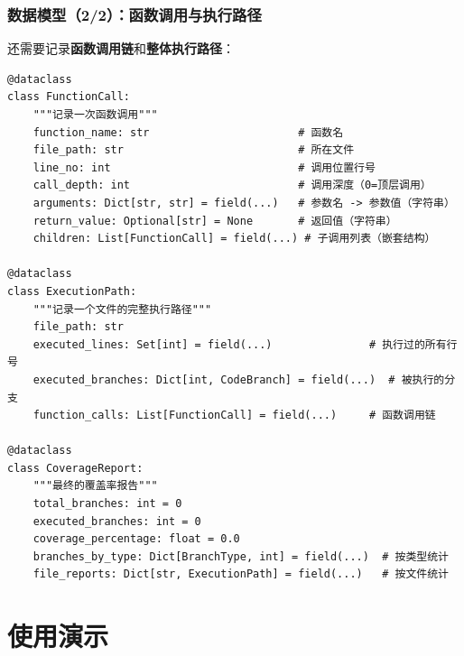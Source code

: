 \documentclass[presentation,aspectratio=169]{ctexbeamer}
\begin{document}
\begin{frame}[fragile]
\frametitle{数据模型（2/2）：函数调用与执行路径}
{\footnotesize 还需要记录\textbf{函数调用链}和\textbf{整体执行路径}：}

\vspace{0.05cm}
{\tiny
\begin{verbatim}
@dataclass
class FunctionCall:
    """记录一次函数调用"""
    function_name: str                       # 函数名
    file_path: str                           # 所在文件
    line_no: int                             # 调用位置行号
    call_depth: int                          # 调用深度（0=顶层调用）
    arguments: Dict[str, str] = field(...)   # 参数名 -> 参数值（字符串）
    return_value: Optional[str] = None       # 返回值（字符串）
    children: List[FunctionCall] = field(...) # 子调用列表（嵌套结构）

@dataclass
class ExecutionPath:
    """记录一个文件的完整执行路径"""
    file_path: str
    executed_lines: Set[int] = field(...)               # 执行过的所有行号
    executed_branches: Dict[int, CodeBranch] = field(...)  # 被执行的分支
    function_calls: List[FunctionCall] = field(...)     # 函数调用链

@dataclass
class CoverageReport:
    """最终的覆盖率报告"""
    total_branches: int = 0
    executed_branches: int = 0
    coverage_percentage: float = 0.0
    branches_by_type: Dict[BranchType, int] = field(...)  # 按类型统计
    file_reports: Dict[str, ExecutionPath] = field(...)   # 按文件统计
\end{verbatim}}
\end{frame}


\section{使用演示}
\end{document}
